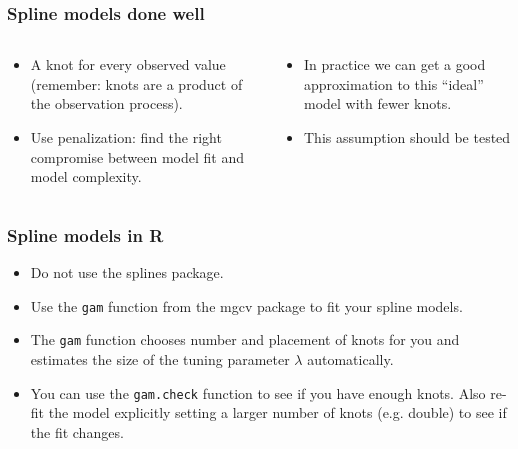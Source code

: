 \documentclass[aspectratio=169]{beamer}
\begin{document}
\begin{frame}
  \frametitle{Spline models done well}

  \begin{columns}
    \begin{column}{5cm}
      \begin{itemize}
      \item A knot for every observed value (remember: knots are a
        product of the observation process).
      \item Use penalization: find the right compromise between model fit
        and model complexity.
      \end{itemize}
    \end{column}
    \begin{column}{5cm}
      \begin{itemize}
      \item In practice we can get a good approximation to this ``ideal''
        model with fewer knots.
      \item This assumption should be tested
      \end{itemize}
    \end{column}
  \end{columns}

\end{frame}

\begin{frame}
  \frametitle{Spline models in R}

  \begin{itemize}
  \item Do not use the \textsf{splines} package.
  \item Use the \texttt{gam} function from the \textsf{mgcv}
    package to fit your spline models.
  \item The \texttt{gam} function chooses number and placement of knots
    for you and estimates the size of the tuning parameter $\lambda$
    automatically.
  \item You can use the \texttt{gam.check} function to see if you have
    enough knots. Also re-fit the model explicitly setting a larger
    number of knots (e.g. double) to see if the fit changes.
  \end{itemize}

\end{frame}
\end{document}
